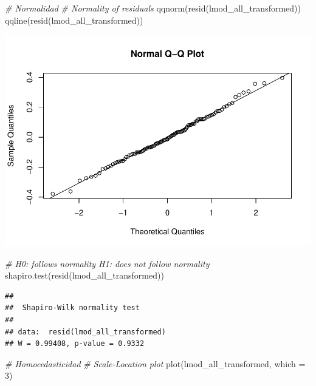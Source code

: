 \documentclass[
]{article}
\newenvironment{Shaded}{\begin{snugshade}}{\end{snugshade}}
\newcommand{\AttributeTok}[1]{\textcolor[rgb]{0.77,0.63,0.00}{#1}}
\newcommand{\CommentTok}[1]{\textcolor[rgb]{0.56,0.35,0.01}{\textit{#1}}}
\newcommand{\DecValTok}[1]{\textcolor[rgb]{0.00,0.00,0.81}{#1}}
\newcommand{\FunctionTok}[1]{\textcolor[rgb]{0.00,0.00,0.00}{#1}}
\newcommand{\NormalTok}[1]{#1}
\begin{document}
\begin{Shaded}
\begin{Highlighting}[]
\CommentTok{\# Normalidad}
\CommentTok{\# Normality of residuals}
\FunctionTok{qqnorm}\NormalTok{(}\FunctionTok{resid}\NormalTok{(lmod\_all\_transformed))}
\FunctionTok{qqline}\NormalTok{(}\FunctionTok{resid}\NormalTok{(lmod\_all\_transformed))}
\end{Highlighting}
\end{Shaded}

\includegraphics{code_files/figure-latex/unnamed-chunk-25-2.pdf}

\begin{Shaded}
\begin{Highlighting}[]
\CommentTok{\# H0: follows normality H1: does not follow normality}
\FunctionTok{shapiro.test}\NormalTok{(}\FunctionTok{resid}\NormalTok{(lmod\_all\_transformed))}
\end{Highlighting}
\end{Shaded}

\begin{verbatim}
## 
##  Shapiro-Wilk normality test
## 
## data:  resid(lmod_all_transformed)
## W = 0.99408, p-value = 0.9332
\end{verbatim}

\begin{Shaded}
\begin{Highlighting}[]
\CommentTok{\# Homocedasticidad}
\CommentTok{\# Scale{-}Location plot}
\FunctionTok{plot}\NormalTok{(lmod\_all\_transformed, }\AttributeTok{which =} \DecValTok{3}\NormalTok{)}
\end{Highlighting}
\end{Shaded}
\end{document}
